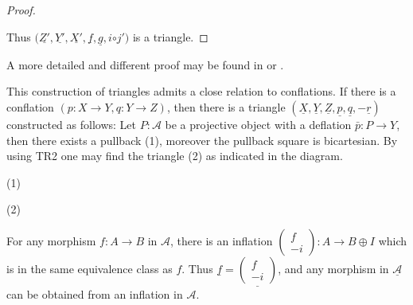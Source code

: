 \begin{proof}
\begin{center}
        \end{center}
        Thus $(\underline{Z'},\underline{Y'},\underline{X'},\underline{f},\underline{g},$\underline{\upside{$\Omega$}$i$}$\circ$\underline{$ j'$}$)$ is a triangle. 
    \end{proof}

    \begin{remark}
        A more detailed and different proof may be found in \cite{Hol12} or \cite{Mat20}.
    \end{remark}

    This construction of triangles admits a close relation to conflations. If there is a conflation $(p:X\rightarrow Y,q:Y\rightarrow Z)$, then there is a triangle $(\underline{X},\underline{Y},\underline{Z},\underline{p},\underline{q},-\underline{r})$ constructed as follows: Let $P:\mathcal{A}$ be a projective object with a deflation $\bar{p}:P\rightarrow Y$, then there exists a pullback (1), moreover the pullback square is bicartesian. By using TR2 one may find the triangle (2) as indicated in the diagram.
    \begin{center}
        (1)
        (2)
    \end{center}

    \begin{remark}
        For any morphism $f:A\rightarrow B$ in $\mathcal{A}$, there is an inflation $\begin{pmatrix}f \\ -i \end{pmatrix}:A\rightarrow B\oplus I$ which is in the same equivalence class as $f$. Thus $\underline{f}=\underline{\begin{pmatrix}f \\ -i \end{pmatrix}}$, and any morphism in $\underline{\mathcal{A}}$ can be obtained from an inflation in $\mathcal{A}$.
    \end{remark}

